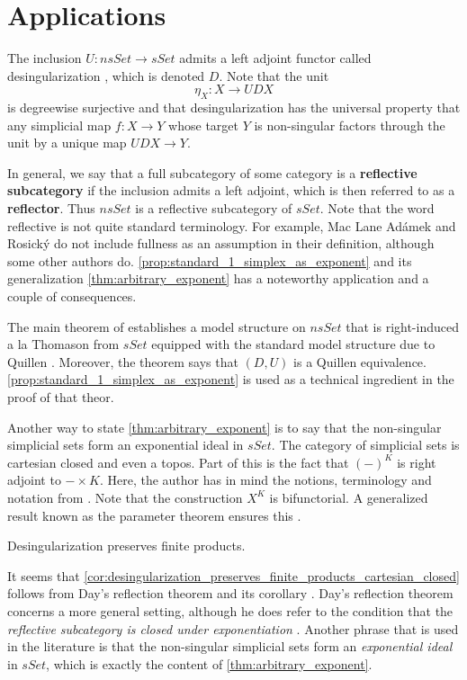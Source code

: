 

\section{Applications}
\label{sec:app}

The inclusion $U:nsSet\to sSet$ admits a left adjoint functor called desingularization \cite[Rem.~2.2.12.,~p.~39]{WJR13}, which is denoted $D$. Note that the unit
\[\eta _X:X\to UDX\]
is degreewise surjective and that desingularization has the universal property that any simplicial map $f:X\to Y$ whose target $Y$ is non-singular factors through the unit by a unique map $UDX\to Y$.

In general, we say that a full subcategory of some category is a \textbf{reflective subcategory} if the inclusion admits a left adjoint, which is then referred to as a \textbf{reflector}. Thus $nsSet$ is a reflective subcategory of $sSet$. Note that the word reflective is not quite standard terminology. For example, Mac Lane \cite[§IV.3]{ML98} Adámek and Rosický \cite[p.~1306]{AR15} do not include fullness as an assumption in their definition, although some other authors do. \cref{prop:standard_1_simplex_as_exponent} and its generalization \cref{thm:arbitrary_exponent} has a noteworthy application and a couple of consequences.

The main theorem of \cite{Fj20-HTY} establishes a model structure on $nsSet$ that is right-induced a la Thomason \cite{Th80} from $sSet$ equipped with the standard model structure due to Quillen \cite{Qu67}. Moreover, the theorem says that $(D,U)$ is a Quillen equivalence. \cref{prop:standard_1_simplex_as_exponent} is used as a technical ingredient in the proof of that theor.

Another way to state \cref{thm:arbitrary_exponent} is to say that the non-singular simplicial sets form an exponential ideal in $sSet$. The category of simplicial sets is cartesian closed and even a topos. Part of this is the fact that $(-)^K$ is right adjoint to $-\times K$. Here, the author has in mind the notions, terminology and notation from \cite[§IV.6--§IV.10]{ML98}. Note that the construction $X^K$ is bifunctorial. A generalized result known as the parameter theorem ensures this \cite[p.~102]{ML98}.
\begin{corollary}\label{cor:desingularization_preserves_finite_products_cartesian_closed}
Desingularization preserves finite products.
\end{corollary}
\noindent It seems that \cref{cor:desingularization_preserves_finite_products_cartesian_closed} follows from Day's reflection theorem \cite[Thm.~1.2]{Da72} and its corollary \cite[Cor.~2.1]{Da72}. Day's reflection theorem concerns a more general setting, although he does refer to the condition that the \emph{reflective subcategory is closed under exponentiation} \cite[§0]{Da72}. Another phrase that is used in the literature is that the non-singular simplicial sets form an \emph{exponential ideal} in $sSet$, which is exactly the content of \cref{thm:arbitrary_exponent}.

